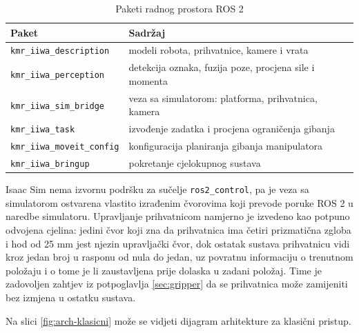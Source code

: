 \begin{table}[H]
    \centering
    \caption{Paketi radnog prostora ROS 2}
    \label{tab:paketi}
    \begin{tabular}{@{}ll@{}}
        \toprule
        Paket                              & Sadržaj                                                \\
        \midrule
        \texttt{kmr\_iiwa\_description}    & modeli robota, prihvatnice, kamere i vrata             \\
        \texttt{kmr\_iiwa\_perception}     & detekcija oznaka, fuzija poze, procjena sile i momenta \\
        \texttt{kmr\_iiwa\_sim\_bridge}    & veza sa simulatorom: platforma, prihvatnica, kamera    \\
        \texttt{kmr\_iiwa\_task}           & izvođenje zadatka i procjena ograničenja gibanja       \\
        \texttt{kmr\_iiwa\_moveit\_config} & konfiguracija planiranja gibanja manipulatora          \\
        \texttt{kmr\_iiwa\_bringup}        & pokretanje cjelokupnog sustava                         \\
        \bottomrule
    \end{tabular}
\end{table}

Isaac Sim nema izvornu podršku za sučelje \texttt{ros2\_control}, pa je veza sa simulatorom
ostvarena vlastito izrađenim čvorovima koji prevode poruke ROS 2 u naredbe simulatoru. Upravljanje
prihvatnicom namjerno je izvedeno kao potpuno odvojena cjelina: jedini čvor koji zna da
prihvatnica ima četiri prizmatična zgloba i hod od 25 mm jest njezin upravljački čvor, dok
ostatak sustava prihvatnicu vidi kroz jedan broj u rasponu od nula do jedan, uz povratnu
informaciju o trenutnom položaju i o tome je li zaustavljena prije dolaska u zadani položaj.
Time je zadovoljen zahtjev iz potpoglavlja \ref{sec:gripper} da se prihvatnica može zamijeniti
bez izmjena u ostatku sustava.

Na slici \ref{fig:arch-klasicni} može se vidjeti dijagram arhitekture za klasični pristup.

